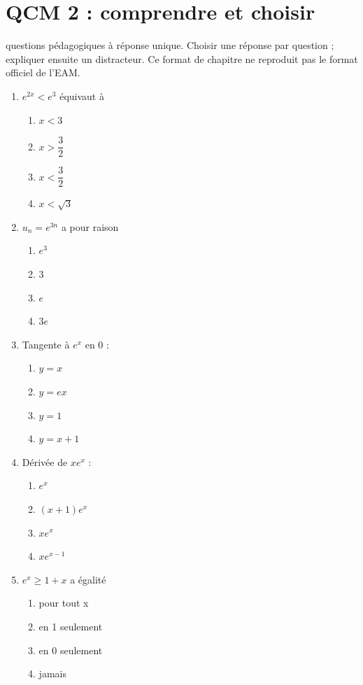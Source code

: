 \endgroup
\begingroup\small
{}\section*{QCM 2 : comprendre et choisir}\label{C09-Q2}
 questions pédagogiques à réponse unique. Choisir une réponse par question ; expliquer ensuite un distracteur. Ce format de chapitre ne reproduit pas le format officiel de l’EAM.
\begin{enumerate}
\item $e^{2x}<e^3$ équivaut à
\begin{enumerate}[label=\Alph*.,itemsep=2pt]
\item $x<3$
\item $x>\dfrac{3}{2}$
\item $x<\dfrac{3}{2}$
\item $x<\sqrt3$
\end{enumerate}
\item $u_n=e^{3n}$ a pour raison
\begin{enumerate}[label=\Alph*.,itemsep=2pt]
\item $e^3$
\item $3$
\item $e$
\item $3e$
\end{enumerate}
\item Tangente à $e^x$ en 0 :
\begin{enumerate}[label=\Alph*.,itemsep=2pt]
\item $y=x$
\item $y=e x$
\item $y=1$
\item $y=x+1$
\end{enumerate}
\item Dérivée de $xe^x$ :
\begin{enumerate}[label=\Alph*.,itemsep=2pt]
\item $e^x$
\item $(x+1)e^x$
\item $xe^x$
\item $xe^{x-1}$
\end{enumerate}
\item $e^x\geq1+x$ a égalité
\begin{enumerate}[label=\Alph*.,itemsep=2pt]
\item pour tout x
\item en 1 seulement
\item en 0 seulement
\item jamais
\end{enumerate}
\end{enumerate}

